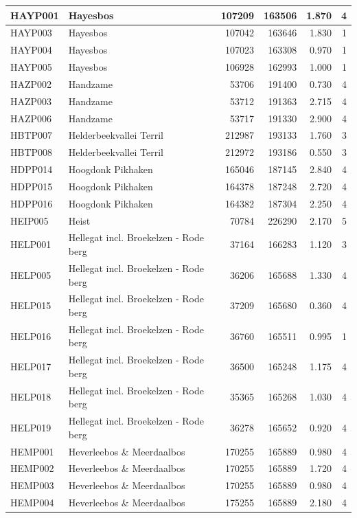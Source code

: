 \documentclass[11pt,]{book}
\begin{document}
\begin{table}
\begin{tabular}[t]{l|l|r|r|r|r}
\hline
HAYP001 & Hayesbos & 107209 & 163506 & 1.870 & 4\\
\hline
HAYP003 & Hayesbos & 107042 & 163646 & 1.830 & 1\\
\hline
HAYP004 & Hayesbos & 107023 & 163308 & 0.970 & 1\\
\hline
HAYP005 & Hayesbos & 106928 & 162993 & 1.000 & 1\\
\hline
HAZP002 & Handzame & 53706 & 191400 & 0.730 & 4\\
\hline
HAZP003 & Handzame & 53712 & 191363 & 2.715 & 4\\
\hline
HAZP006 & Handzame & 53717 & 191330 & 2.900 & 4\\
\hline
HBTP007 & Helderbeekvallei Terril & 212987 & 193133 & 1.760 & 3\\
\hline
HBTP008 & Helderbeekvallei Terril & 212972 & 193186 & 0.550 & 3\\
\hline
HDPP014 & Hoogdonk Pikhaken & 165046 & 187145 & 2.840 & 4\\
\hline
HDPP015 & Hoogdonk Pikhaken & 164378 & 187248 & 2.720 & 4\\
\hline
HDPP016 & Hoogdonk Pikhaken & 164382 & 187304 & 2.250 & 4\\
\hline
HEIP005 & Heist & 70784 & 226290 & 2.170 & 5\\
\hline
HELP001 & Hellegat  incl. Broekelzen - Rode berg & 37164 & 166283 & 1.120 & 3\\
\hline
HELP005 & Hellegat  incl. Broekelzen - Rode berg & 36206 & 165688 & 1.330 & 4\\
\hline
HELP015 & Hellegat  incl. Broekelzen - Rode berg & 37209 & 165680 & 0.360 & 4\\
\hline
HELP016 & Hellegat  incl. Broekelzen - Rode berg & 36760 & 165511 & 0.995 & 1\\
\hline
HELP017 & Hellegat  incl. Broekelzen - Rode berg & 36500 & 165248 & 1.175 & 4\\
\hline
HELP018 & Hellegat  incl. Broekelzen - Rode berg & 35365 & 165268 & 1.030 & 4\\
\hline
HELP019 & Hellegat  incl. Broekelzen - Rode berg & 36278 & 165652 & 0.920 & 4\\
\hline
HEMP001 & Heverleebos \& Meerdaalbos & 170255 & 165889 & 0.980 & 4\\
\hline
HEMP002 & Heverleebos \& Meerdaalbos & 170255 & 165889 & 1.720 & 4\\
\hline
HEMP003 & Heverleebos \& Meerdaalbos & 170255 & 165889 & 0.980 & 4\\
\hline
HEMP004 & Heverleebos \& Meerdaalbos & 175255 & 165889 & 2.180 & 4\\

\end{tabular}
\end{table}
\end{document}
